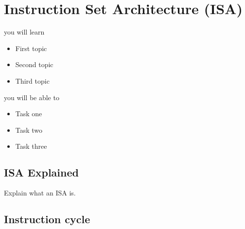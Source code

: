 \setchapterpreamble[u]{\margintoc}
\chapter{Instruction Set Architecture (ISA)}

%
\begin{kaobox}[frametitle=In This Chapter]
you will learn
\begin{itemize}
	\item First topic
	\item Second topic
        \item Third topic
\end{itemize}

you will be able to
\begin{itemize}
        \item Task one
        \item Task two
        \item Task three
\end{itemize}
\end{kaobox}

\blindtext

%
\section{ISA Explained}
Explain what an ISA is.

%
\section{Instruction cycle}
\blindtext

